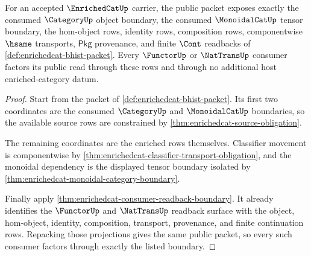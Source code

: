 \begin{theorem}\label{thm:enrichedcat-public-packet-source-boundary}
For an accepted $\EnrichedCatUp$ carrier, the public packet exposes exactly the
consumed $\CategoryUp$ object boundary, the consumed $\MonoidalCatUp$ tensor
boundary, the hom-object rows, identity rows, composition rows, componentwise
$\hsame$ transports, $\mathsf{Pkg}$ provenance, and finite $\Cont$ readbacks
of \autoref{def:enrichedcat-bhist-packet}. Every $\FunctorUp$ or
$\NatTransUp$ consumer factors its public read through these rows and through
no additional host enriched-category datum.
\end{theorem}
\begin{proof}
Start from the packet of \autoref{def:enrichedcat-bhist-packet}. Its first two
coordinates are the consumed $\CategoryUp$ and $\MonoidalCatUp$ boundaries, so
the available source rows are constrained by
\autoref{thm:enrichedcat-source-obligation}.

The remaining coordinates are the enriched rows themselves. Classifier movement
is componentwise by \autoref{thm:enrichedcat-classifier-transport-obligation},
and the monoidal dependency is the displayed tensor boundary isolated by
\autoref{thm:enrichedcat-monoidal-category-boundary}.

Finally apply \autoref{thm:enrichedcat-consumer-readback-boundary}. It already
identifies the $\FunctorUp$ and $\NatTransUp$ readback surface with the object,
hom-object, identity, composition, transport, provenance, and finite
continuation rows. Repacking those projections gives the same public packet,
so every such consumer factors through exactly the listed boundary.
\end{proof}

